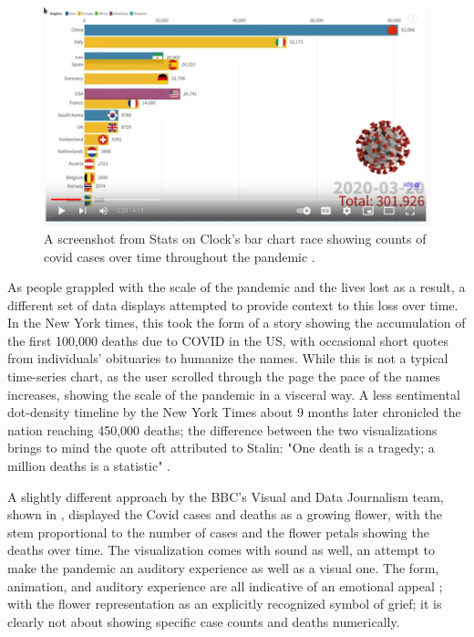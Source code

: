 \documentclass[article]{jdssv}\usepackage[]{graphicx}\usepackage[]{xcolor}
\begin{document}
\begin{figure}
\centering
\includegraphics[width=.8\linewidth]{Figures_Web/Bar-chart-race-screenshot}
\caption{A screenshot from Stats on Clock's bar chart race showing counts of covid cases over time throughout the pandemic \citep{clockCoronavirusCasesBar2022}.}\label{fig:barchart-race}
\end{figure}

As people grappled with the scale of the pandemic and the lives lost as a result, a different set of data displays attempted to provide context to this loss over time. In the New York times, this took the form of a story showing the accumulation of the first 100,000 deaths due to COVID in the US, with occasional short quotes from individuals' obituaries to humanize the names\citep{barryRemembering1000002020}. While this is not a typical time-series chart, as the user scrolled through the page the pace of the names increases, showing the scale of the pandemic in a visceral way. A less sentimental dot-density timeline by the New York Times about 9 months later chronicled the nation reaching 450,000 deaths; the difference between the two visualizations brings to mind the quote oft attributed to Stalin: "One death is a tragedy; a million deaths is a statistic" \citep{investigatorSingleDeathTragedy2016}.

A slightly different approach by the BBC's Visual and Data Journalism team, shown in , displayed the Covid cases and deaths as a growing flower, with the stem proportional to the number of cases and the flower petals showing the deaths over time\citep{thebbcvisualanddatajournalismteamCoronavirusHowCan2020}. The visualization comes with sound as well, an attempt to make the pandemic an auditory experience as well as a visual one. The form, animation, and auditory experience are all indicative of an emotional appeal \citep{kostelnick_re-emergence_2016,dignazio_data_2020}; with the flower representation as an explicitly recognized symbol of grief; it is clearly not about showing specific case counts and deaths numerically.
\end{document}

